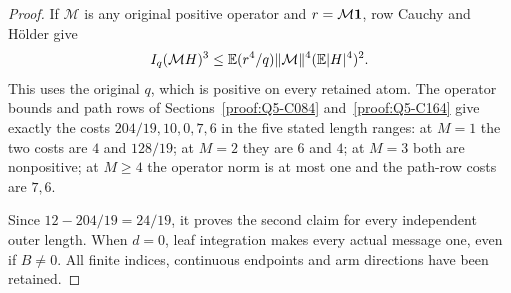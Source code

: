 \begin{proof}
If \(\mathcal M\) is any original positive operator
and \(r=\mathcal M\mathbf1\), row Cauchy and H\"older give
\[
 I_q(\mathcal MH)^3\le\mathbb E(r^4/q)\|\mathcal M\|^4(\mathbb E|H|^4)^2.
\]
This uses the original \(q\), which is positive on every retained atom.
The operator bounds and path rows of
Sections~\ref{proof:Q5-C084} and~\ref{proof:Q5-C164} give exactly
the costs \(204/19,10,0,7,6\) in the five stated length ranges:
at \(M=1\) the two costs are \(4\) and \(128/19\);
at \(M=2\) they are \(6\) and \(4\);
at \(M=3\) both are nonpositive; at \(M\ge4\) the operator
norm is at most one and the path-row costs are \(7,6\).

Since \(12-204/19=24/19\), it proves the second claim for every
independent outer length.
When \(d=0\), leaf integration makes every actual message one,
even if \(B\ne0\).  All finite indices,
continuous endpoints and arm directions have been retained.
\end{proof}

